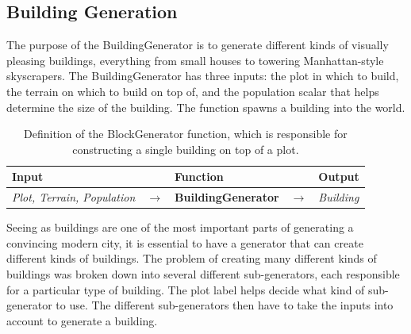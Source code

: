 \subsection{Building Generation}
The purpose of the BuildingGenerator is to generate different kinds of visually pleasing buildings, everything from small houses to towering Manhattan-style skyscrapers. 
The BuildingGenerator has three inputs: the plot in which to build, the terrain on which to build on top of, and the population scalar that helps determine the size of the building.
The function spawns a building into the world. 

\begin{table}[H]
    \centering
    \begin{tabular}{lllll}
      \textbf{Input}                           &               & \textbf{Function}            &               & \textbf{Output}         \\
      \midrule
      \textit{Plot, Terrain, Population}       & $\rightarrow$ & \textbf{BuildingGenerator}   & $\rightarrow$ & \textit{Building}       \\
      \bottomrule
    \end{tabular}
 
    \caption{Definition of the BlockGenerator function, which is responsible for constructing a single building on top of a plot.}
    \label{table:buildinggen}
  \end{table}
  \vspace{-0.4cm} 

Seeing as buildings are one of the most important parts of generating a convincing modern city, it is essential to have a generator that can create different kinds of buildings. 
The problem of creating many different kinds of buildings was broken down into several different sub-generators, each responsible for a particular type of building.
The plot label helps decide what kind of sub-generator to use. 
The different sub-generators then have to take the inputs into account to generate a building.


